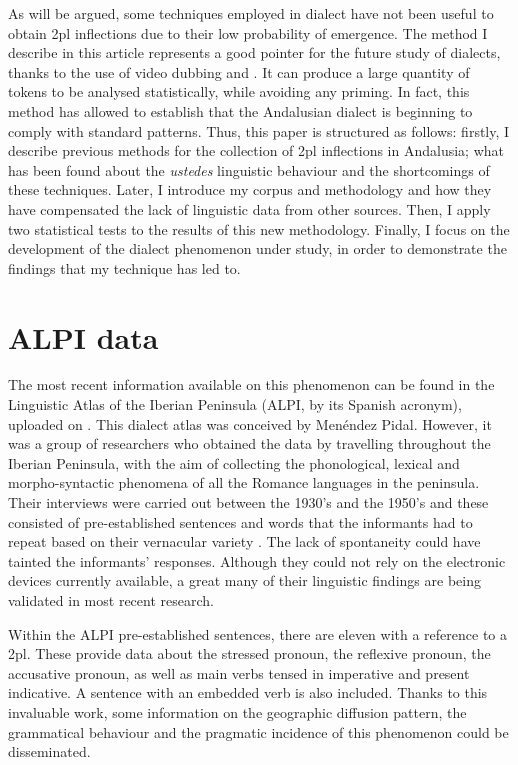 \documentclass[output=paper]{LSP/langsci}
\begin{document}
As will be argued, some techniques employed in dialect  have not been useful to obtain 2pl inflections due to their low probability of emergence. The method I describe in this article represents a good pointer for the future study of dialects, thanks to the use of video dubbing and . It can produce a large quantity of tokens to be analysed statistically, while avoiding any priming. In fact, this method has allowed to establish that the Andalusian dialect is beginning to comply with standard patterns. Thus, this paper is structured as follows: firstly, I describe previous methods for the collection of 2pl inflections in Andalusia; what has been found about the \textit{ustedes} linguistic behaviour and the shortcomings of these techniques. Later, I introduce my corpus and methodology and how they have compensated the lack of linguistic data from other sources. Then, I apply two statistical tests to the results of this new methodology. Finally, I focus on the development of the dialect phenomenon under study, in order to demonstrate the findings that my technique has led to.

\section{ALPI data}

The most recent information available on this phenomenon can be found in the Linguistic Atlas of the Iberian Peninsula (ALPI, by its Spanish acronym), uploaded on \citet{heap_atlas_2003}. This dialect atlas was conceived by Menéndez Pidal. However, it was a group of researchers who obtained the data by travelling throughout the Iberian Peninsula, with the aim of collecting the phonological, lexical and morpho-syntactic phenomena of all the Romance languages in the peninsula. Their interviews were carried out between the 1930’s and the 1950’s and these consisted of pre-established sentences and words that the informants had to repeat based on their vernacular variety \citep{sanchis_guarner_atlas_1962}. The lack of spontaneity could have tainted the informants’ responses. Although they could not rely on the electronic devices currently available, a great many of their linguistic findings are being validated in most recent research. 

Within the ALPI pre-established sentences, there are eleven with a reference to a 2pl. These provide data about the stressed pronoun, the reflexive pronoun, the accusative pronoun, as well as main verbs tensed in imperative and present indicative. A sentence with an embedded verb is also included. Thanks to this invaluable work, some information on the geographic diffusion pattern, the grammatical behaviour and the pragmatic incidence of this phenomenon could be disseminated.
\end{document}
